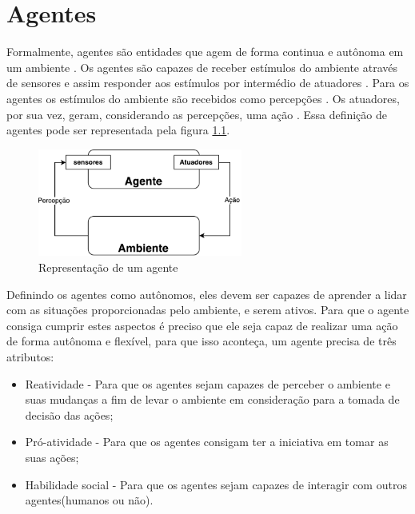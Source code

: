 \chapter{\label{chap:agentes}Agentes}



Formalmente, agentes são entidades que agem de forma continua e autônoma em um ambiente \cite{agent1993oriented}. Os agentes são capazes de receber estímulos do ambiente através de sensores e assim responder aos estímulos por intermédio de atuadores \cite{intelligence2003modern}. Para os agentes os estímulos do ambiente são recebidos como percepções \cite{intelligence2003modern}. Os atuadores, por sua vez, geram, considerando as percepções, uma ação \cite{intelligence2003modern}. Essa definição de agentes pode ser representada pela figura \ref{fig:agente}.

\begin{figure}[ht]
	\centering
	\includegraphics[width=0.6\textwidth]{fig/agente.pdf}
	\caption{Representação de um agente}
	\label{fig:agente}
\end{figure} 

Definindo os agentes como autônomos, eles devem ser capazes de aprender a lidar com as situações proporcionadas pelo ambiente, e serem ativos. Para que o agente consiga cumprir estes aspectos é preciso que ele seja capaz de realizar uma ação de forma autônoma e flexível, para que isso aconteça, um agente precisa de três atributos\cite{agent1999}: 

\begin{itemize}
	\item Reatividade - Para que os agentes sejam capazes de perceber o ambiente e suas mudanças a fim de levar o ambiente em consideração para a tomada de decisão das ações;
	\item Pró-atividade - Para que os agentes consigam ter a iniciativa em tomar as suas ações;
	\item Habilidade social - Para que os agentes sejam capazes de interagir com outros agentes(humanos ou não).
\end{itemize}

